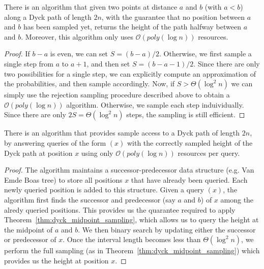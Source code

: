 \begin{theorem}
\label{thm:dyck_midpoint_sampling}
There is an algorithm that given two points at distance $a$ and $b$ (with $a < b$) along a Dyck path of length $2n$,
with the guarantee that no position between $a$ and $b$ has been sampled yet,
returns the height of the path halfway between $a$ and $b$.
Moreover, this algorithm only uses $\mathcal O(poly(\log n))$ resources.
\end{theorem}
\begin{proof}
If $b-a$ is even, we can set $S = (b-a)/2$.
Otherwise, we first sample a single step from $a$ to $a+1$, and then set $S = (b-a-1)/2$.
Since there are only two possibilities for a single step,
we can explicitly compute an approximation of the probabilities, and then sample accordingly.
Now, if $S > \Theta(\log^2 n)$ we can simply use the rejection sampling procedure described above
to obtain a $\mathcal O(poly(\log n))$ algorithm.
Otherwise, we sample each step induividually.
Since there are only $2S = \Theta(\log^2 n)$ steps, the sampling is still efficient.
\end{proof}

\begin{theorem}
\label{thm:dyck_sampling}
There is an algorithm that provides sample access to a Dyck path of length $2n$,
by answering queries of the form $(x)$ with the correctly sampled height of the Dyck path at position $x$
using only $\mathcal O(poly(\log n))$ resources per query.
\end{theorem}
\begin{proof}
The algorithm maintains a successor-predecessor data structure (e.g. Van Emde Boas tree)
to store all positions $x$ that have already been queried.
Each newly queried position is added to this structure.
Given a query $(x)$, the algorithm first finds the successor and predecessor
(say $a$ and $b$) of $x$ among the alredy queried positions.
This provides us the quarantee required to apply Theorem~\ref{thm:dyck_midpoint_sampling},
which allows us to query the height at the midpoint of $a$ and $b$.
We then binary search by updating either the successor or predecessor of $x$.
Once the interval length becomes less than $\Theta(\log^2 n)$,
we perform the full sampling (as in Theorem~\ref{thm:dyck_midpoint_sampling}) which provides us the height at position $x$.
\end{proof}

